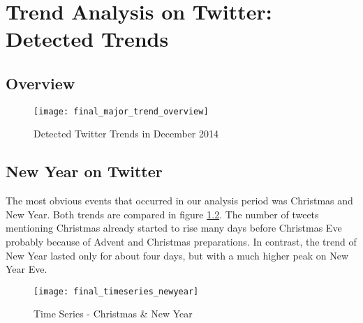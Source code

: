 \chapter{Trend Analysis on Twitter: Detected Trends}
\label{cha:trend-stories}

\section{Overview}
\label{sec:trend-overview}
\begin{figure}[H]
  \centering
        \texttt{[image: final\_major\_trend\_overview]}
  \caption[Detected Twitter Trends in December 2014]{Detected Twitter Trends in December 2014}
  \label{fig:major-trend-overview}
  \vspace{-1.3em}
\end{figure}


\section{New Year on Twitter}
\label{sec:happy-new-year}
The most obvious events that occurred in our analysis period was Christmas and New Year. Both trends are compared in figure \ref{fig:christmas-new-year-time-series}. The number of tweets mentioning Christmas already started to rise many days before Christmas Eve probably because of Advent and Christmas preparations. In contrast, the trend of New Year lasted only for about four days, but with a much higher peak on New Year Eve.

\begin{figure}[H]
  \centering
        \texttt{[image: final\_timeseries\_newyear]}
  \caption[Time Series - Christmas \& New Year ]{Time Series - Christmas \& New Year}
  \label{fig:christmas-new-year-time-series}
  \vspace{-1.3em}
\end{figure}

